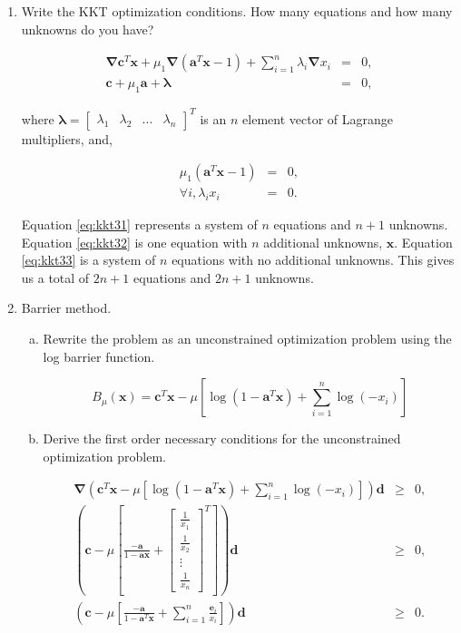 \documentclass{article}
\begin{document}
\begin{enumerate}

\item Write the KKT optimization conditions. How many equations and how many unknowns do you have?

\begin{eqnarray}
	\boldsymbol{\nabla}\mathbf{c}^T \mathbf{x} + \mu_1 \boldsymbol{\nabla} (\mathbf{a}^T \mathbf{x} - 1) + \sum_{i=1}^n \lambda_i \boldsymbol{\nabla} x_i &=& 0, \\
	\label{eq:kkt31} \mathbf{c} + \mu_1 \mathbf{a} + \boldsymbol{\lambda} &=& 0,
\end{eqnarray}

where $\boldsymbol{\lambda} = \begin{bmatrix}
\lambda_1 & \lambda_2 & ... & \lambda_{n}
\end{bmatrix}^T$ is an $n$ element vector of Lagrange multipliers, and,

\begin{eqnarray}
	\label{eq:kkt32} \mu_1(\mathbf{a}^T \mathbf{x} - 1) &=& 0,\\
	\label{eq:kkt33} \forall i, \lambda_i x_i &=& 0.
\end{eqnarray}

Equation \ref{eq:kkt31} represents a system of $n$ equations and $n+1$ unknowns.
Equation \ref{eq:kkt32} is one equation with $n$ additional unknowns, $\mathbf{x}$.
Equation \ref{eq:kkt33} is a system of $n$ equations with no additional unknowns.
This gives us a total of $2n + 1$ equations and $2n + 1$ unknowns.

\item Barrier method.
\begin{enumerate}[a)]
	\item Rewrite the problem as an unconstrained optimization problem using the log barrier function.
	
	\begin{equation*}
	B_\mu(\mathbf{x}) = \mathbf{c}^T \mathbf{x} - \mu\left[\log(1 - \mathbf{a}^T \mathbf{x}) + \sum_{i=1}^n \log(-x_i)\right]
	\end{equation*}
	
	\item Derive the first order necessary conditions for the unconstrained optimization problem.
	
	\begin{eqnarray*}
	\boldsymbol{\nabla}\left(\mathbf{c}^T \mathbf{x} - \mu\left[\log(1 - \mathbf{a}^T \mathbf{x}) + \sum_{i=1}^n \log(-x_i)\right]\right)\mathbf{d} &\ge& 0, \\
	\left(\mathbf{c} - \mu\left[\frac{-\mathbf{a}}{1 - \mathbf{a} \mathbf{x}} + \begin{bmatrix} \frac{1}{x_1} \\ \frac{1}{x_2} \\ \vdots \\ \frac{1}{x_n}\end{bmatrix}^T\right]\right)\mathbf{d} &\ge& 0, \\
	\left(\mathbf{c} - \mu\left[\frac{-\mathbf{a}}{1 - \mathbf{a}^T \mathbf{x}} + \sum_{i=1}^n \frac{\mathbf{e}_i}{x_i}\right]\right)\mathbf{d} &\ge& 0.
	\end{eqnarray*}
	

\end{enumerate}
\end{enumerate}
\end{document}
